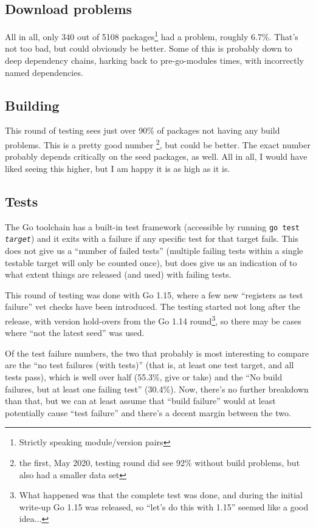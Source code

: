 \documentclass[a4paper]{paper}
\begin{document}


\subsection{Download problems}

All in all, only 340 out of 5108 packages\footnote{Strictly speaking
  module/version pairs} had a problem, roughly 6.7\%. That's not too
bad, but could obviously be better. Some of this is probably down to
deep dependency chains, harking back to pre-go-modules times, with
incorrectly named dependencies.

\subsection{Building}

This round of testing sees just over 90\% of packages not having any
build problems. This is a pretty good number \footnote{the first, May
  2020, testing round did see 92\% without build problems, but also
  had a smaller data set}, but could be better. The exact number
probably depends critically on the seed packages, as well. All in all,
I would have liked seeing this higher, but I am happy it is as high as
it is.


\subsection{Tests}

The Go toolchain has a built-in test framework (accessible by running
{\tt go test {\it target}}) and it exits with a failure if any
specific test for that target fails. This does not give us a ``number
of failed tests'' (multiple failing tests within a single testable
target will only be counted once), but does give us an indication of
to what extent things are released (and used) with failing tests.

This round of testing was done with Go 1.15, where a few new
``registers as test failure'' vet checks have been introduced. The
testing started not long after the release, with version hold-overs
from the Go 1.14 round\footnote{What happened was that the complete test was
  done, and during the initial write-up Go 1.15 was released, so
  ``let's do this with 1.15'' seemed like a good idea...}, so there
may be cases where ``not the latest seed'' was used.

Of the test failure numbers, the two that probably is most interesting
to compare are the ``no test failures (with tests)'' (that is, at
least one test target, and all tests pass), which is well over half
(55.3\%, give or take) and the ``No build failures, but at least one
failing test'' (30.4\%). Now, there's no further breakdown than that,
but we can at least assume that ``build failure'' would at least
potentially cause ``test failure'' and there's a decent margin
between the two.
\end{document}
